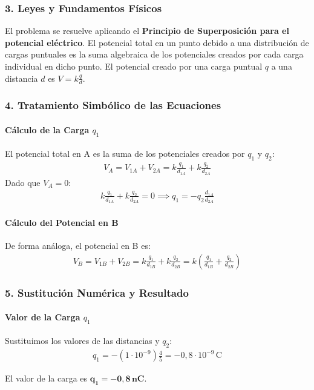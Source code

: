 \subsubsection*{3. Leyes y Fundamentos Físicos}
El problema se resuelve aplicando el \textbf{Principio de Superposición para el potencial eléctrico}. El potencial total en un punto debido a una distribución de cargas puntuales es la suma algebraica de los potenciales creados por cada carga individual en dicho punto. El potencial creado por una carga puntual $q$ a una distancia $d$ es $V = k \frac{q}{d}$.

\subsubsection*{4. Tratamiento Simbólico de las Ecuaciones}
\paragraph*{Cálculo de la Carga $q_1$}
El potencial total en A es la suma de los potenciales creados por $q_1$ y $q_2$:
\begin{gather}
    V_A = V_{1A} + V_{2A} = k \frac{q_1}{d_{1A}} + k \frac{q_2}{d_{2A}}
\end{gather}
Dado que $V_A = 0$:
\begin{gather}
    k \frac{q_1}{d_{1A}} + k \frac{q_2}{d_{2A}} = 0 \implies q_1 = -q_2 \frac{d_{1A}}{d_{2A}}
\end{gather}
\paragraph*{Cálculo del Potencial en B}
De forma análoga, el potencial en B es:
\begin{gather}
    V_B = V_{1B} + V_{2B} = k \frac{q_1}{d_{1B}} + k \frac{q_2}{d_{2B}} = k \left( \frac{q_1}{d_{1B}} + \frac{q_2}{d_{2B}} \right)
\end{gather}

\subsubsection*{5. Sustitución Numérica y Resultado}
\paragraph*{Valor de la Carga $q_1$}
Sustituimos los valores de las distancias y $q_2$:
\begin{gather}
    q_1 = -(1 \cdot 10^{-9}) \frac{4}{5} = -0,8 \cdot 10^{-9} \, \text{C}
\end{gather}
\begin{cajaresultado}
El valor de la carga es $\boldsymbol{q_1 = -0,8 \, nC}$.
\end{cajaresultado}
